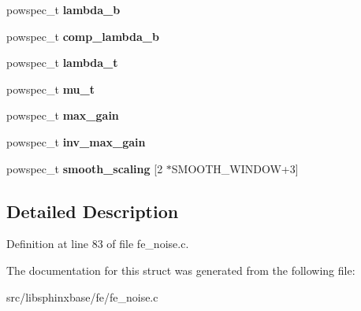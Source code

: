 \begin{DoxyCompactItemize}
\item 
powspec\-\_\-t {\bfseries lambda\-\_\-b}\label{structnoise__stats__s_a56527a4cfd15aac96133ed20989c89c7}

\item 
powspec\-\_\-t {\bfseries comp\-\_\-lambda\-\_\-b}\label{structnoise__stats__s_ac3317afbf629cadc04b41c5657f0140d}

\item 
powspec\-\_\-t {\bfseries lambda\-\_\-t}\label{structnoise__stats__s_a94d5961c9df8d3345821c2f6c4358514}

\item 
powspec\-\_\-t {\bfseries mu\-\_\-t}\label{structnoise__stats__s_ad5cc76a830669ea5fbf0b8f4e4f80652}

\item 
powspec\-\_\-t {\bfseries max\-\_\-gain}\label{structnoise__stats__s_afeda1bf01ce753f6b3e4fb89279cfc63}

\item 
powspec\-\_\-t {\bfseries inv\-\_\-max\-\_\-gain}\label{structnoise__stats__s_ab6b62f1324e05bafa461bdcab8bc1bf3}

\item 
powspec\-\_\-t {\bfseries smooth\-\_\-scaling} [2 $\ast$S\-M\-O\-O\-T\-H\-\_\-\-W\-I\-N\-D\-O\-W+3]\label{structnoise__stats__s_a4bc8cd91479f20703fdf82251ba90e6e}

\end{DoxyCompactItemize}


\subsection{Detailed Description}


Definition at line 83 of file fe\-\_\-noise.\-c.



The documentation for this struct was generated from the following file\-:\begin{DoxyCompactItemize}
\item 
src/libsphinxbase/fe/fe\-\_\-noise.\-c\end{DoxyCompactItemize}

